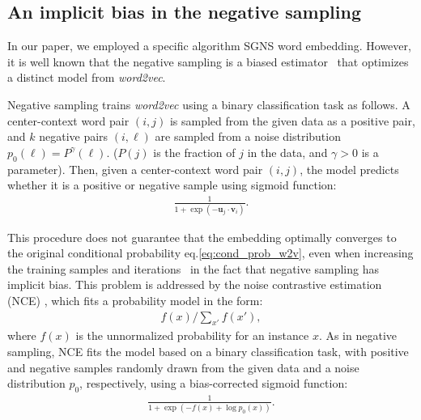 \documentclass[12pt,a4paper]{article}
\begin{document}
\subsection{An implicit bias in the negative sampling}

In our paper, we employed a specific algorithm SGNS word embedding. However, it is well known that the negative sampling is a biased estimator~\autocite{Chia2010,Dyer2014} that optimizes a distinct model  from {\it word2vec}.

Negative sampling trains {\it word2vec} using a binary classification task as follows.
A center-context word pair $(i,j)$ is sampled from the given data as a positive pair, and $k$ negative pairs $(i,\ell)$ are sampled from a noise distribution $p_0(\ell)=P^\gamma(\ell)$. ($P(j)$ is the fraction of $j$ in the data, and $\gamma>0$ is a parameter).
Then, given a center-context word pair $(i,j)$, the model predicts whether it is a positive or negative sample using sigmoid function:
\begin{align}
	\label{eq:sigmoid}
	\frac{1}{1 + \exp\left( - \bm{u}_j \cdot \bm{v}_i \right)}.
\end{align}

This procedure does not guarantee that the embedding optimally converges to the original conditional probability eq.\ref{eq:cond_prob_w2v}, even when increasing the training samples and iterations~\autocite{Chia2010,Dyer2014} in the fact that negative sampling has implicit bias.
This problem is addressed by the noise contrastive estimation (NCE) \autocite{Chia2010}, which fits a probability model in the form:
\begin{align}
	\label{eq:nce}
	f(x) / \sum_{x'} f(x'),
\end{align}
where $f(x)$ is the unnormalized probability for an instance $x$. As in negative sampling, NCE fits the model based on a binary classification task, with positive and negative samples randomly drawn from the given data and a noise distribution $p_0$, respectively, using a bias-corrected sigmoid function:
\begin{align}
	\label{eq:sigmoid2}
	\frac{1}{1 + \exp\left( -f(x) + \log p_0(x) \right)}.
\end{align}
\end{document}

